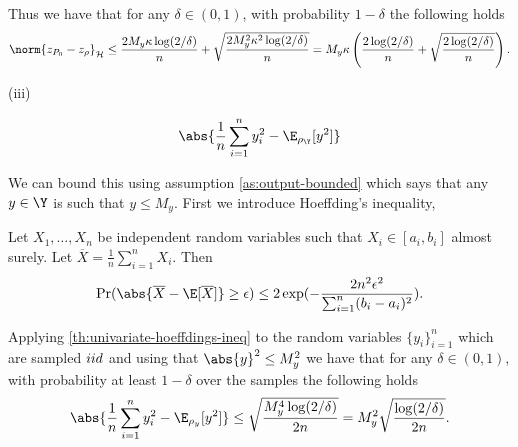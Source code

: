 Thus we have that for any \(\delta \in (0, 1)\), with  probability \(1 -
\delta\) the following holds
\begin{equation}
  \label{eq:zs_RKHS_hoeffding}
  \norm{z_{\poolset_0} - z_{\rho}}_{\rkhs{H}} \leq \frac{2 M_y \kappa \log(2/\delta)}{n} + \sqrt{\frac{2 M_y^2 \kappa^2 \log(2/\delta)}{n}} = M_y \kappa \left(\frac{2\log(2/\delta)}{n} + \sqrt{\frac{2\log(2/\delta)}{n}} \right).
\end{equation}

\begin{description}
\item[{(iii)}] 
\end{description}
\begin{equation*}
  \abs{\frac{1}{n} \sum_{i=1}^n y_i^2 - \E_{\rho_{\Y}}[y^2]}
\end{equation*}

We can bound this using assumption \ref{as:output-bounded} which says that any
\(y \in \Y\) is such that \(y \leq M_y\). First we introduce Hoeffding's inequality,
\begin{theorem}
  \label{th:univariate-hoeffdings-ineq}
  Let \(X_{1}, \dots, X_{n}\) be independent random variables such that \(X_{i}
  \in [a_{i}, b_{i}]\) almost surely. Let \(\overline{X} = \frac{1}{n}
  \sum_{i=1}^n X_i\). Then
  \begin{equation*}
    \label{eq:univariate-hoeffdings-ineq}
    \Pr(\abs{\overline{X} - \E[\overline{X}]} \geq \epsilon) \leq 2 \exp(-\frac{2n^2\epsilon^2}{\sum_{i=1}^n(b_i - a_i)^2}).
  \end{equation*}
\end{theorem}
Applying \ref{th:univariate-hoeffdings-ineq} to the random variables
\(\{y_{i}\}_{i=1}^{n}\) which are sampled \(iid\) and using that \(\abs{y}^{2}
\leq M_{y}^{2}\) we have that for any \(\delta \in (0, 1)\), with probability at
least \(1 - \delta\) over the samples the following holds
\begin{equation}
  \label{eq:y2s_hoeffding}
  \abs{\frac{1}{n} \sum_{i=1}^n y_i^2 - \E_{\rho_{y}}[y^2]} \leq \sqrt{\frac{M_y^4 \log(2/\delta)}{2n}} = M_y^2\sqrt{\frac{\log(2/\delta)}{2n}}.
\end{equation}

